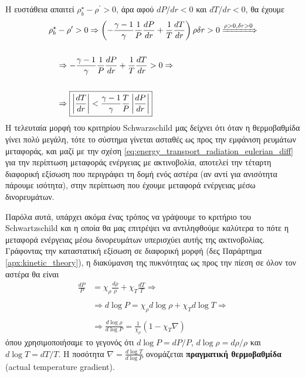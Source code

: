 Η ευστάθεια απαιτεί $\rho_b^{\star} - \rho^{\prime} > 0$, άρα αφού $dP/dr < 0$ και $dT/dr < 0$, θα έχουμε
\begin{align}
    \label{eq:convection:schwarzschild_criterion_dT_dr}
    \nonumber \rho_b^{\star} &- \rho^{\prime} > 0 \Rightarrow \left(- \frac{\gamma - 1}{\gamma}\frac{1}{P} \frac{dP}{dr} + \frac{1}{T} \frac{dT}{dr}\right) \rho \delta r > 0 \xRightarrow{\rho > 0, \delta r > 0} \\\nonumber \\
    \nonumber &\Rightarrow - \frac{\gamma - 1}{\gamma}\frac{1}{P} \frac{dP}{dr} + \frac{1}{T} \frac{dT}{dr} > 0 \Rightarrow \\\nonumber\\
    &\Rightarrow \boxed{\left| \frac{dT}{dr} \right| < \frac{\gamma - 1}{\gamma} \frac{T}{P} \left| \frac{dP}{dr}\right|}
\end{align}
Η τελευταία μορφή του κριτηρίου Schwarzschild μας δείχνει ότι όταν η θερμοβαθμίδα γίνει πολύ μεγάλη, τότε το σύστημα γίνεται ασταθές ως προς την εμφάνιση ρευμάτων μεταφοράς, και μαζί με την σχέση \eqref{eq:energy_transport_radiation_eulerian_diff} για την περίπτωση μεταφοράς ενέργειας με ακτινοβολία, αποτελεί την τέταρτη διαφορική εξίσωση που περιγράφει τη δομή ενός αστέρα (αν αντί για ανισότητα πάρουμε ισότητα), στην περίπτωση που έχουμε μεταφορά ενέργειας μέσω δινορευμάτων.

Παρόλα αυτά, υπάρχει ακόμα ένας τρόπος να γράψουμε το κριτήριο του Schwartzschild και η οποία θα μας επιτρέψει να αντιληφθούμε καλύτερα το πότε η μεταφορά ενέργειας μέσω δινορευμάτων υπερισχύει αυτής της ακτινοβολίας.
Γράφοντας την καταστατική εξίσωση σε διαφορική μορφή (δες Παράρτημα \ref{apx:kinetic_theory}), η διακύμανση της πυκνότητας ως προς την πίεση σε όλον τον αστέρα θα είναι
\begin{align}
    \label{eq:convection:dlogRho_dlogP_actual_temp_gradient}
    \nonumber \frac{dP}{P} &= \chi_\rho \frac{d\rho}{\rho} + \chi_T \frac{dT}{T} \Rightarrow \\\nonumber\\
    \nonumber &\Rightarrow d\log P = \chi_\rho d\log \rho + \chi_T d\log T \Rightarrow \\\nonumber\\
     &\Rightarrow \frac{d\log \rho}{d \log P} = \frac{1}{\chi_\rho} \left( 1 - \chi_T \nabla \right)
\end{align}
όπου χρησιμοποιήσαμε το γεγονός ότι $d\log P = dP/P$, $d\log \rho = d\rho/\rho$ και $d\log T = dT/T$. Η ποσότητα $\displaystyle \nabla = \frac{d\log T}{d \log P}$ ονομάζεται \textbf{πραγματική θερμοβαθμίδα} (actual temperature gradient).

